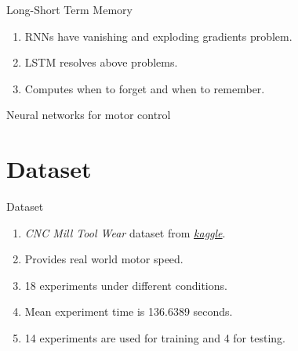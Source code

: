 \documentclass[handout]{beamer}
\begin{document}
\begin{frame}{Long-Short Term Memory}
  \begin{enumerate}
    \item RNNs have vanishing and exploding gradients problem.
    \item LSTM resolves above problems.
    \item Computes when to forget and when to remember.
  \end{enumerate}
\end{frame}

%

\begin{frame}{}
  \center\Large{\color{blue}Neural networks for motor control}
\end{frame}

\section{Dataset}
\begin{frame}{Dataset}
  \begin{enumerate}
    \item \textit{CNC Mill Tool Wear} dataset from \href{https://www.kaggle.com/shasun/tool-wear-detection-in-cnc-mill}{\color{blue}\textit{kaggle}}.
    \item Provides real world motor speed.
    \item 18 experiments under different conditions.
    \item Mean experiment time is 136.6389 seconds.
    \item 14 experiments are used for training and 4 for testing.
  \end{enumerate}
\end{frame}
\end{document}
